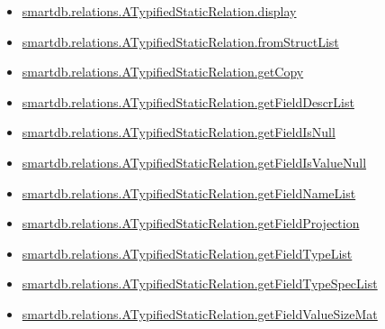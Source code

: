 \documentclass[letterpaper,10pt,english]{sphinxmanual}
\begin{document}
\begin{itemize}
\item {} 
{\hyperref[chap_functions:smartdb-relations-atypifiedstaticrelation-display]{smartdb.relations.ATypifiedStaticRelation.display}}

\item {} 
{\hyperref[chap_functions:smartdb-relations-atypifiedstaticrelation-fromstructlist]{smartdb.relations.ATypifiedStaticRelation.fromStructList}}

\item {} 
{\hyperref[chap_functions:smartdb-relations-atypifiedstaticrelation-getcopy]{smartdb.relations.ATypifiedStaticRelation.getCopy}}

\item {} 
{\hyperref[chap_functions:smartdb-relations-atypifiedstaticrelation-getfielddescrlist]{smartdb.relations.ATypifiedStaticRelation.getFieldDescrList}}

\item {} 
{\hyperref[chap_functions:smartdb-relations-atypifiedstaticrelation-getfieldisnull]{smartdb.relations.ATypifiedStaticRelation.getFieldIsNull}}

\item {} 
{\hyperref[chap_functions:smartdb-relations-atypifiedstaticrelation-getfieldisvaluenull]{smartdb.relations.ATypifiedStaticRelation.getFieldIsValueNull}}

\item {} 
{\hyperref[chap_functions:smartdb-relations-atypifiedstaticrelation-getfieldnamelist]{smartdb.relations.ATypifiedStaticRelation.getFieldNameList}}

\item {} 
{\hyperref[chap_functions:smartdb-relations-atypifiedstaticrelation-getfieldprojection]{smartdb.relations.ATypifiedStaticRelation.getFieldProjection}}

\item {} 
{\hyperref[chap_functions:smartdb-relations-atypifiedstaticrelation-getfieldtypelist]{smartdb.relations.ATypifiedStaticRelation.getFieldTypeList}}

\item {} 
{\hyperref[chap_functions:smartdb-relations-atypifiedstaticrelation-getfieldtypespeclist]{smartdb.relations.ATypifiedStaticRelation.getFieldTypeSpecList}}

\item {} 
{\hyperref[chap_functions:smartdb-relations-atypifiedstaticrelation-getfieldvaluesizemat]{smartdb.relations.ATypifiedStaticRelation.getFieldValueSizeMat}}


\end{itemize}
\end{document}
